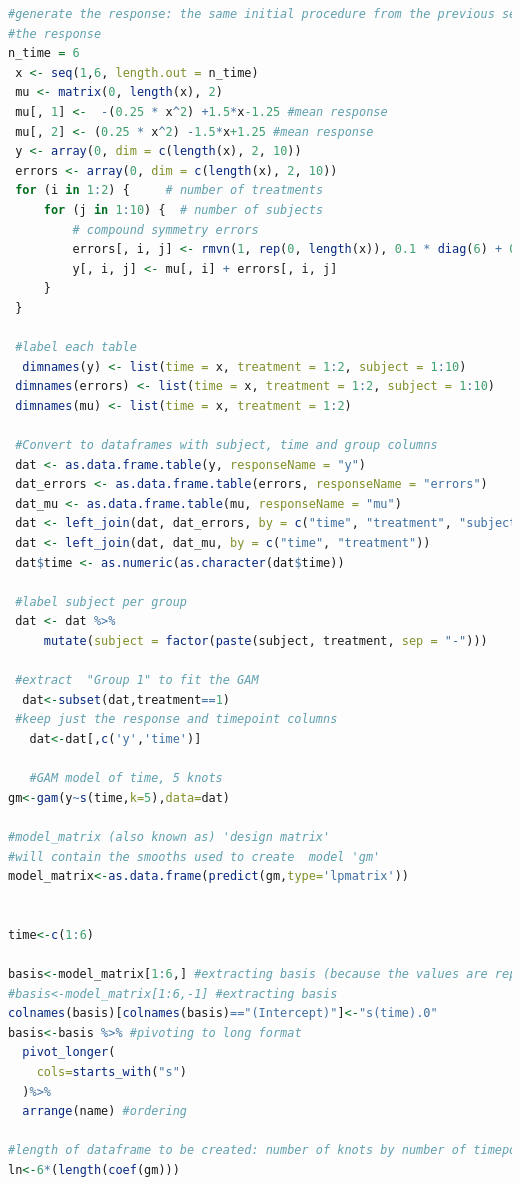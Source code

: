 \documentclass[
]{article}
\begin{document}
\begin{lstlisting}[language=R]
#generate the response: the same initial procedure from the previous section to simulate
#the response
n_time = 6
 x <- seq(1,6, length.out = n_time)
 mu <- matrix(0, length(x), 2)
 mu[, 1] <-  -(0.25 * x^2) +1.5*x-1.25 #mean response
 mu[, 2] <- (0.25 * x^2) -1.5*x+1.25 #mean response
 y <- array(0, dim = c(length(x), 2, 10))
 errors <- array(0, dim = c(length(x), 2, 10))
 for (i in 1:2) {     # number of treatments
     for (j in 1:10) {  # number of subjects
         # compound symmetry errors
         errors[, i, j] <- rmvn(1, rep(0, length(x)), 0.1 * diag(6) + 0.25 * matrix(1, 6, 6))
         y[, i, j] <- mu[, i] + errors[, i, j]
     }
 }
 
 #label each table
  dimnames(y) <- list(time = x, treatment = 1:2, subject = 1:10)
 dimnames(errors) <- list(time = x, treatment = 1:2, subject = 1:10)
 dimnames(mu) <- list(time = x, treatment = 1:2)
 
 #Convert to dataframes with subject, time and group columns
 dat <- as.data.frame.table(y, responseName = "y")
 dat_errors <- as.data.frame.table(errors, responseName = "errors")
 dat_mu <- as.data.frame.table(mu, responseName = "mu")
 dat <- left_join(dat, dat_errors, by = c("time", "treatment", "subject"))
 dat <- left_join(dat, dat_mu, by = c("time", "treatment"))
 dat$time <- as.numeric(as.character(dat$time))
 
 #label subject per group
 dat <- dat %>%
     mutate(subject = factor(paste(subject, treatment, sep = "-")))
  
 #extract  "Group 1" to fit the GAM
  dat<-subset(dat,treatment==1)
 #keep just the response and timepoint columns
   dat<-dat[,c('y','time')]

   #GAM model of time, 5 knots
gm<-gam(y~s(time,k=5),data=dat)

#model_matrix (also known as) 'design matrix'
#will contain the smooths used to create  model 'gm'
model_matrix<-as.data.frame(predict(gm,type='lpmatrix'))


time<-c(1:6)

basis<-model_matrix[1:6,] #extracting basis (because the values are repeated after every 6 rows)
#basis<-model_matrix[1:6,-1] #extracting basis
colnames(basis)[colnames(basis)=="(Intercept)"]<-"s(time).0"
basis<-basis %>% #pivoting to long format
  pivot_longer(
    cols=starts_with("s")
  )%>%
  arrange(name) #ordering

#length of dataframe to be created: number of knots by number of timepoints (minus 1 for the intercept that we won't plot)
ln<-6*(length(coef(gm))) 


\end{lstlisting}
\end{document}
